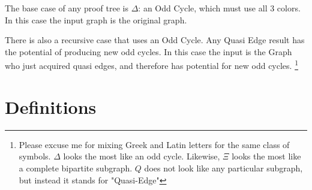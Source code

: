 \documentclass{article}
\begin{document}
The base case of any proof tree is $\Delta$: an Odd Cycle, which must use all 3 colors. In this case the input graph is the original graph.

There is also a recursive case that uses an Odd Cycle. Any Quasi Edge result has the potential of producing new odd cycles. In this case the input is the Graph who just acquired quasi edges, and therefore has potential for new odd cycles. \footnote{Please excuse me for mixing Greek and Latin letters for the same class of symbols. $\Delta$ looks the most like an odd cycle. Likewise, $\Xi$ looks the most like a complete bipartite subgraph. $Q$ does not look like any particular subgraph, but instead it stands for "Quasi-Edge"}


\section{Definitions}
\end{document}
